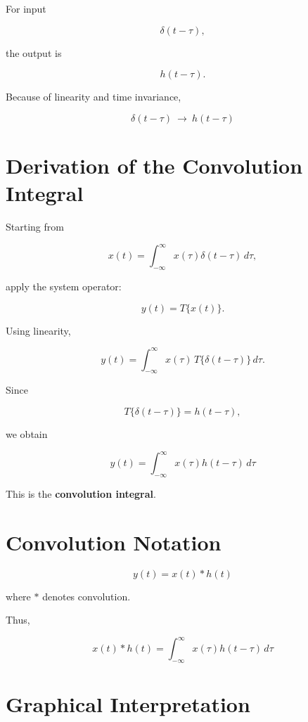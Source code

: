 For input

\[
\delta(t-\tau),
\]

the output is

\[
h(t-\tau).
\]

Because of linearity and time invariance,

\[
\boxed{
\delta(t-\tau)\ \longrightarrow\ h(t-\tau)
}
\]


\section{Derivation of the Convolution Integral}

Starting from

\[
x(t)=\int_{-\infty}^{\infty}x(\tau)\delta(t-\tau)\,d\tau,
\]

apply the system operator:

\[
y(t)=T\{x(t)\}.
\]

Using linearity,

\[
y(t)=
\int_{-\infty}^{\infty}
x(\tau)\,T\{\delta(t-\tau)\}\,d\tau.
\]

Since

\[
T\{\delta(t-\tau)\}=h(t-\tau),
\]

we obtain

\[
\boxed{
y(t)=\int_{-\infty}^{\infty}x(\tau)h(t-\tau)\,d\tau
}
\]

This is the \textbf{convolution integral}.


\section{Convolution Notation}

\[
\boxed{
y(t)=x(t)*h(t)
}
\]

where \(*\) denotes convolution.

Thus,

\[
\boxed{
x(t)*h(t)
=
\int_{-\infty}^{\infty}x(\tau)h(t-\tau)\,d\tau
}
\]


\section{Graphical Interpretation}

